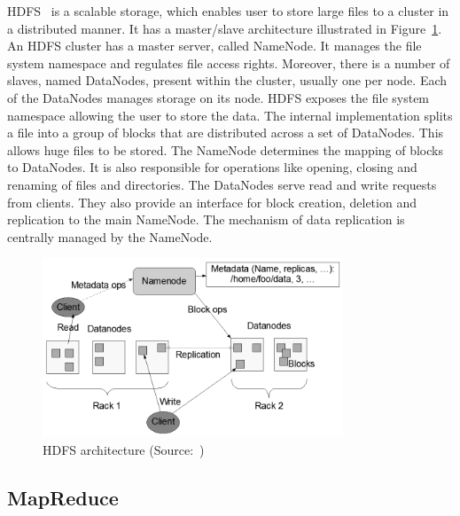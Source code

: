 HDFS~\cite{hdfs_architecture} is a scalable storage, which enables user to store large files to a cluster in a distributed manner. It has a master/slave architecture illustrated in Figure~\ref{figure:hdfs_architecture}. An HDFS cluster has a master server, called NameNode. It manages the file system namespace and regulates file access rights. Moreover, there is a number of slaves, named DataNodes, present within the cluster, usually one per node. Each of the DataNodes manages storage on its node. HDFS exposes the file system namespace allowing the user to store the data. The internal implementation splits a file into a group of blocks that are distributed across a set of DataNodes. This allows huge files to be stored. The NameNode determines the mapping of blocks to DataNodes. It is also responsible for operations like opening, closing and renaming of files and directories. The DataNodes serve read and write requests from clients. They also provide an interface for block creation, deletion and replication to the main NameNode. The mechanism of data replication is centrally managed by the NameNode.

\begin{figure}[!htb]
	\centering
	\caption{HDFS architecture (Source:~\cite{hdfs_architecture})}
	\label{figure:hdfs_architecture}
	\vspace{1em}
	\includegraphics[width=0.8\textwidth]{images/hdfs_architecture.png}
\end{figure}

\subsection{MapReduce}
\label{subsection:mapreduce}

